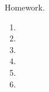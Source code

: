 \documentclass[12pt,preprint]{aastex}  %
\begin{document}
Homework.

\begin{enumerate}
	\item 
	\item 
\item 
\item 
\item 
\item 
\end{enumerate}
\end{document}
